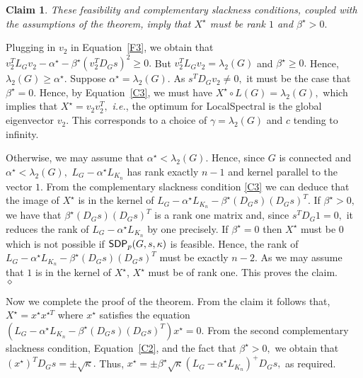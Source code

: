 \documentclass[11pt]{article}
\newtheorem{claim}{Claim}
\newenvironment{proof}{\noindent {\em Proof:}}{\\\hspace*{\fill}\mbox{$\diamond$}}
\newcommand{\sdp}{{\sf SDP}}
\begin{document}
\begin{claim}
\label{claim:rankone}
These feasibility and complementary slackness conditions, coupled with the 
assumptions of the theorem, imply that  $X^{\star}$ must be 
rank $1$ and $\beta^{\star}>0.$
\end{claim}
\begin{proof}  Plugging in $v_{2}$ in Equation~\eqref{F3}, we obtain that 
$ v_{2}^{T}L_{G}v_{2} - \alpha^{\star} -\beta^{\star}  (v_{2}^T D_{G} s)^{2} \geq 0.$
But $ v_{2}^{T}L_{G}v_{2}=\lambda_{2}(G)$ and $\beta^{\star} \geq 0.$ Hence, $\lambda_{2}(G) \geq \alpha^{\star}.$ 
Suppose $\alpha^\star = \lambda_2(G).$ As $s^T D_{G} v_2 \neq 0,$ it must be the case that $\beta^\star = 0.$ Hence, by Equation~\eqref{C3}, we must have $X^\star \circ L(G) = \lambda_2(G),$ which implies that $X^\star = v_2v_2^T,$ {\em i.e.},  the optimum for \textsf{LocalSpectral} is the global eigenvector $v_2$. This corresponds to a choice of $\gamma = \lambda_2(G)$ and $c$ tending to infinity.

Otherwise, we may assume that $\alpha^\star< \lambda_2(G).$ Hence, since $G$ is connected and $\alpha^{\star} <\lambda_{2}(G),$ $L_{G}-\alpha^{\star}L_{K_{n}}$ has rank exactly $n-1$ and kernel parallel to the vector $1.$ 
From the complementary slackness condition \eqref{C3} we can deduce that the image of $X^{\star}$ is in the kernel of $ L_{G}- \alpha^\star  L_{K_{n}}  - \beta^\star ( D_{G} {s})( D_{G} {s})^T.$ 
If $\beta^\star > 0,$ we have that $ \beta^\star ( D_{G} {s})( D_{G} {s})^T$ is a rank one matrix and, since $s^T D_{G} 1 = 0,$ it reduces the rank of $L_{G}-\alpha^{\star}L_{K_{n}}$ by one precisely. If $\beta^{\star}=0$ then $X^{\star}$ must be $0$ which is not possible  if $\sdp_{p}(G,s,\kappa)$ is feasible.
Hence, the rank of $ L_{G}- \alpha^\star  L_{K_{n}}  - \beta^\star ( D_{G} {s})( D_{G} {s})^T$ must be exactly $n-2.$ As we may assume that $1$ is in the kernel of $X^\star$, $X^{\star}$ must be of rank one. 
This proves the claim. 
\end{proof}




\noindent
Now we complete the proof of the theorem.
From the claim it follows that, $X^{\star}=x^{\star}x^{\star T}$ where $x^{\star}$ satisfies the equation 
$  (L_{G}- \alpha^\star  L_{K_{n}}  - \beta^\star ( D_{G} {s})( D_{G} {s})^T)x^{\star}=0.$
From the second complementary slackness condition, 
Equation~\eqref{C2},
and the fact that $\beta^{\star}>0,$ we obtain that 
$ (x^{\star})^T D_{G} s = \pm \sqrt{\kappa}.$ 
Thus, 
$x^{\star} =\pm \beta^{\star} \sqrt{\kappa} (L_{G}-\alpha^{\star}L_{K_{n}})^{+}D_{G}s,$ as required. 
\end{document}
